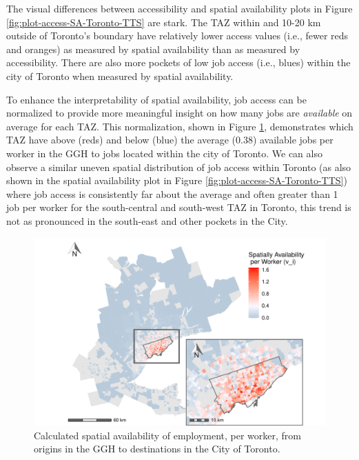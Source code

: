 \documentclass[]{elsarticle} %
\begin{document}
\newpage

The visual differences between accessibility and spatial availability
plots in Figure \ref{fig:plot-access-SA-Toronto-TTS} are stark. The TAZ
within and 10-20 km outside of Toronto's boundary have relatively lower
access values (i.e., fewer reds and oranges) as measured by spatial
availability than as measured by accessibility. There are also more
pockets of low job access (i.e., blues) within the city of Toronto when
measured by spatial availability.

To enhance the interpretability of spatial availability, job access can
be normalized to provide more meaningful insight on how many jobs are
\emph{available} on average for each TAZ. This normalization, shown in
Figure \ref{fig:plot-avail-Toronto-TTS-per-worker}, demonstrates which
TAZ have above (reds) and below (blue) the average (0.38) available jobs
per worker in the GGH to jobs located within the city of Toronto. We can
also observe a similar uneven spatial distribution of job access within
Toronto (as also shown in the spatial availability plot in Figure
\ref{fig:plot-access-SA-Toronto-TTS}) where job access is consistently
far about the average and often greater than 1 job per worker for the
south-central and south-west TAZ in Toronto, this trend is not as
pronounced in the south-east and other pockets in the City.

\begin{figure}
\includegraphics[width=1\linewidth]{Spatial-Availability_files/figure-latex/plot-avail-Toronto-TTS-per-worker-1} \caption{\label{fig:plot-avail-Toronto-TTS-per-worker}Calculated spatial availability of employment, per worker, from origins in the GGH to destinations in the City of Toronto.}\label{fig:plot-avail-Toronto-TTS-per-worker}
\end{figure}
\end{document}
